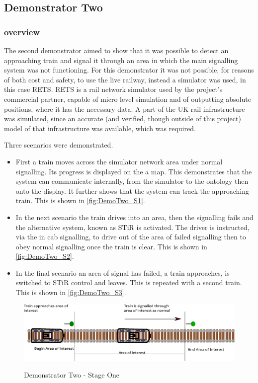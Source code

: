 \subsection{Demonstrator Two}
\label{sec:demotwo}
\subsubsection{overview}

The second demonstrator aimed to show that it was possible to detect an approaching train and signal it through an area in which the main signalling system was not functioning. For this demonstrator it was not possible, for reasons of both cost and safety, to use the live railway, instead a simulator was used, in this case RETS. RETS is a rail network simulator used by the project's commercial partner, capable of micro level simulation and of outputting absolute positions, where it has the necessary data. A part of the UK rail infrastructure was simulated, since an accurate (and verified, though outside of this project) model of that infrastructure was available, which was required.

Three scenarios were demonstrated.  
 \begin{itemize}
\item First a train moves across the simulator network area under normal signalling. Its progress is displayed on the a map. This demonstrates that the system can communicate internally, from the simulator to the ontology then onto the display. It further shows that the system can track the approaching train. This is shown in \autoref{fig:DemoTwo_S1}.
\item In the next scenario the train drives into an area, then the signalling fails and the alternative system, known as STiR is activated. The driver is instructed, via the in cab signalling, to drive out of the area of failed signalling then to obey normal signalling once the train is clear. This is shown in \autoref{fig:DemoTwo_S2}.
\item In the final scenario an area of signal has failed, a train approaches, is switched to STiR control and leaves. This is repeated with a second train. This is shown in \autoref{fig:DemoTwo_S3}.
\end{itemize}

\begin{figure}[H]
\myfloatalign
{\includegraphics[max height=\textheight,max width=\linewidth]{gfx/DemoTwo_StageOne}} 
\caption{Demonstrator Two - Stage One}
\label{fig:DemoTwo_S1}
\end{figure}

